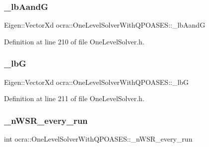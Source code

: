 \subsubsection{\texorpdfstring{\+\_\+lb\+AandG}{\_lbAandG}}
{\footnotesize\ttfamily Eigen\+::\+Vector\+Xd ocra\+::\+One\+Level\+Solver\+With\+Q\+P\+O\+A\+S\+E\+S\+::\+\_\+lb\+AandG\hspace{0.3cm}{\ttfamily [protected]}}



Definition at line 210 of file One\+Level\+Solver.\+h.

\hypertarget{classocra_1_1OneLevelSolverWithQPOASES_ace6b99f95cf3d633fb0bb96c7871c57f}{}\label{classocra_1_1OneLevelSolverWithQPOASES_ace6b99f95cf3d633fb0bb96c7871c57f} 
\subsubsection{\texorpdfstring{\+\_\+lbG}{\_lbG}}
{\footnotesize\ttfamily Eigen\+::\+Vector\+Xd ocra\+::\+One\+Level\+Solver\+With\+Q\+P\+O\+A\+S\+E\+S\+::\+\_\+lbG\hspace{0.3cm}{\ttfamily [protected]}}



Definition at line 211 of file One\+Level\+Solver.\+h.

\hypertarget{classocra_1_1OneLevelSolverWithQPOASES_af1bb606a75434adb15ad68b6db213848}{}\label{classocra_1_1OneLevelSolverWithQPOASES_af1bb606a75434adb15ad68b6db213848} 
\subsubsection{\texorpdfstring{\+\_\+n\+W\+S\+R\+\_\+every\+\_\+run}{\_nWSR\_every\_run}}
{\footnotesize\ttfamily int ocra\+::\+One\+Level\+Solver\+With\+Q\+P\+O\+A\+S\+E\+S\+::\+\_\+n\+W\+S\+R\+\_\+every\+\_\+run\hspace{0.3cm}{\ttfamily [protected]}}



